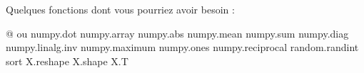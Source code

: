%


Quelques fonctions dont vous pourriez avoir besoin :

\begin{verbatimx}
@                     ou numpy.dot
numpy.array
numpy.abs
numpy.mean
numpy.sum
numpy.diag
numpy.linalg.inv
numpy.maximum
numpy.ones
numpy.reciprocal
random.randint
sort
X.reshape
X.shape
X.T
\end{verbatimx}




